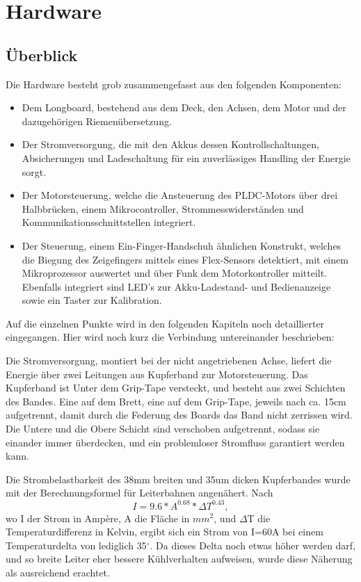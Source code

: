\chapter{Hardware}
\label{Hardware}
\section{Überblick}

Die Hardware besteht grob zusammengefasst aus den folgenden Komponenten:
\begin{itemize}
	\item Dem Longboard, bestehend aus dem Deck, den Achsen, dem Motor und der dazugehörigen Riemenübersetzung.
	\item Der Stromversorgung, die mit den Akkus dessen Kontrollschaltungen, Absicherungen und Ladeschaltung für ein zuverlässiges Handling der Energie sorgt.
	\item Der Motorsteuerung, welche die Ansteuerung des PLDC-Motors über drei Halbbrücken, einem Mikrocontroller, Strommesswiderständen und Kommunikationsschnittstellen integriert.
	\item Der Steuerung, einem Ein-Finger-Handschuh ähnlichen Konstrukt, welches die Biegung des Zeigefingers mittels eines Flex-Sensors detektiert, mit einem Mikroprozessor auswertet und über Funk dem Motorkontroller mitteilt. Ebenfalls integriert sind LED’s zur Akku-Ladestand- und Bedienanzeige sowie ein Taster zur Kalibration.
\end{itemize}
Auf die einzelnen Punkte wird in den folgenden Kapiteln noch detaillierter eingegangen. Hier wird noch kurz die Verbindung untereinander beschrieben:

Die Stromversorgung, montiert bei der nicht angetriebenen Achse, liefert die Energie über zwei Leitungen aus Kupferband zur Motorsteuerung. Das Kupferband ist Unter dem Grip-Tape versteckt, und besteht aus zwei Schichten des Bandes. Eine auf dem Brett, eine auf dem Grip-Tape, jeweils nach ca. 15cm aufgetrennt, damit durch die Federung des Boards das Band nicht zerrissen wird. Die Untere und die Obere Schicht sind verschoben aufgetrennt, sodass sie einander immer überdecken, und ein problemloser Stromfluss garantiert werden kann.

Die Strombelastbarkeit des 38mm breiten und 35um dicken Kupferbandes wurde mit der Berechnungsformel für Leiterbahnen angenähert.
Nach
\[ I = 9.6 * A^{0.68} * \Delta T ^{0.43},\] 
wo I der Strom in Ampère, A die Fläche in \(mm^2\), und \(\Delta\)T die Temperaturdifferenz in Kelvin,
ergibt sich ein Strom von I=60A bei einem Temperaturdelta von lediglich 35\(^\circ\). Da dieses Delta noch etwas höher werden darf, und so breite Leiter eher bessere Kühlverhalten aufweisen, wurde diese Näherung als ausreichend erachtet.

